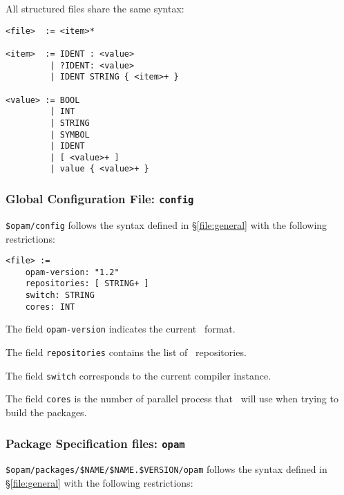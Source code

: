\documentclass[a4paper,10pt]{article}
\begin{document}
All structured files share the same syntax:

{\small
\begin{Verbatim}[frame=single]
<file>  := <item>*

<item>  := IDENT : <value>
         | ?IDENT: <value>
         | IDENT STRING { <item>+ }

<value> := BOOL
         | INT
         | STRING
         | SYMBOL
         | IDENT
         | [ <value>+ ]
         | value { <value>+ }
\end{Verbatim}
}

\subsubsection{Global Configuration File: {\tt config}}
\label{file:config}

\verb+$opam/config+ follows the syntax defined in \S\ref{file:general} with
the following restrictions:

{\small
\begin{Verbatim}[frame=single]
<file> :=
    opam-version: "1.2"
    repositories: [ STRING+ ]
    switch: STRING
    cores: INT
\end{Verbatim}
}

The field {\tt opam-version} indicates the current \OPAM\ format.

The field {\tt repositories} contains the list of \OPAM\ repositories.

The field {\tt switch} corresponds to the current compiler instance.

The field {\tt cores} is the number of parallel process that
\OPAM\ will use when trying to build the packages.

\subsubsection{Package Specification files: {\tt opam}}
\label{file:opam}

\verb+$opam/packages/$NAME/$NAME.$VERSION/opam+ follows the syntax defined in
\S\ref{file:general} with the following restrictions:
\end{document}
